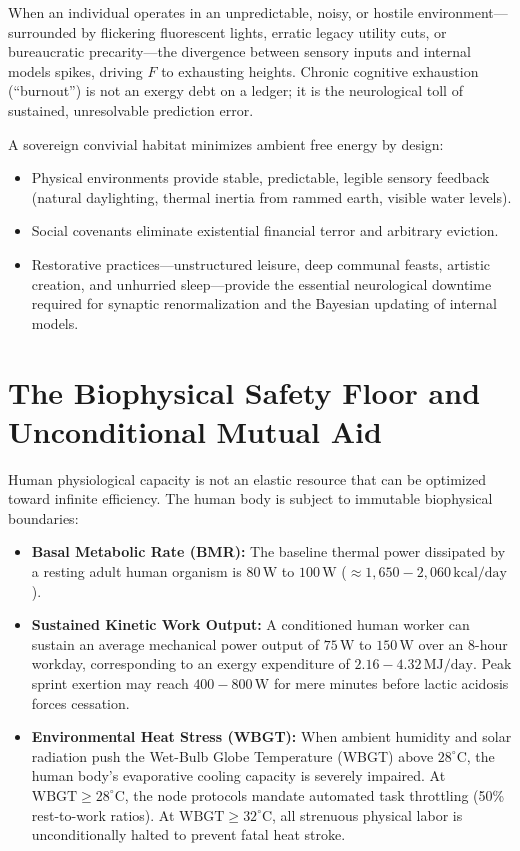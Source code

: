 When an individual operates in an unpredictable, noisy, or hostile environment---surrounded by flickering fluorescent lights, erratic legacy utility cuts, or bureaucratic precarity---the divergence between sensory inputs and internal models spikes, driving $F$ to exhausting heights. Chronic cognitive exhaustion (``burnout'') is not an exergy debt on a ledger; it is the neurological toll of sustained, unresolvable prediction error.

A sovereign convivial habitat minimizes ambient free energy by design:
\begin{itemize}
    \item Physical environments provide stable, predictable, legible sensory feedback (natural daylighting, thermal inertia from rammed earth, visible water levels).
    \item Social covenants eliminate existential financial terror and arbitrary eviction.
    \item Restorative practices---unstructured leisure, deep communal feasts, artistic creation, and unhurried sleep---provide the essential neurological downtime required for synaptic renormalization and the Bayesian updating of internal models.
\end{itemize}

\section{The Biophysical Safety Floor and Unconditional Mutual Aid}
\label{sec:biophysical_safety_floor}

Human physiological capacity is not an elastic resource that can be optimized toward infinite efficiency. The human body is subject to immutable biophysical boundaries:
\begin{itemize}
    \item \textbf{Basal Metabolic Rate (BMR):} The baseline thermal power dissipated by a resting adult human organism is $80\,\mathrm{W}$ to $100\,\mathrm{W}$ ($\approx 1{,}650 - 2{,}060\,\mathrm{kcal/day}$).
    \item \textbf{Sustained Kinetic Work Output:} A conditioned human worker can sustain an average mechanical power output of $75\,\mathrm{W}$ to $150\,\mathrm{W}$ over an 8-hour workday, corresponding to an exergy expenditure of $2.16 - 4.32\,\mathrm{MJ/day}$. Peak sprint exertion may reach $400 - 800\,\mathrm{W}$ for mere minutes before lactic acidosis forces cessation.
    \item \textbf{Environmental Heat Stress (WBGT):} When ambient humidity and solar radiation push the Wet-Bulb Globe Temperature (WBGT) above $28^\circ\mathrm{C}$, the human body's evaporative cooling capacity is severely impaired. At $\text{WBGT} \ge 28^\circ\mathrm{C}$, the node protocols mandate automated task throttling (50\% rest-to-work ratios). At $\text{WBGT} \ge 32^\circ\mathrm{C}$, all strenuous physical labor is unconditionally halted to prevent fatal heat stroke.
\end{itemize}

